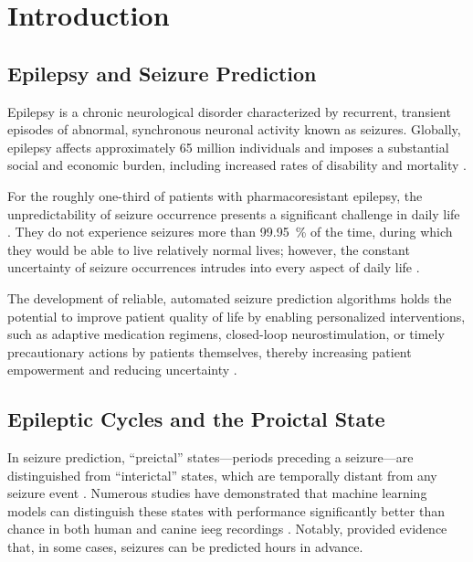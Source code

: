\chapter{Introduction}\label{ch:introduction}
\section{Epilepsy and Seizure Prediction}
Epilepsy is a chronic neurological disorder characterized by recurrent, transient episodes of abnormal, synchronous neuronal activity known as seizures.
Globally, epilepsy affects approximately 65 million individuals and imposes a substantial social and economic burden, including increased rates of disability and mortality \parencite{leonardi_global_2002, feigin_global_2021}.

For the roughly one-third of patients with pharmacoresistant epilepsy, the unpredictability of seizure occurrence presents a significant challenge in daily life \parencite{schulze-bonhage_unpredictability_2008}.
They do not experience seizures more than \SI{99.95}{\percent} of the time, during which they would be able to live relatively normal lives; however, the constant uncertainty of seizure occurrences intrudes into every aspect of daily life \parencite{freestone_forward-looking_2017}.

The development of reliable, automated seizure prediction algorithms holds the potential to improve patient quality of life by enabling personalized interventions, such as adaptive medication regimens, closed-loop neurostimulation, or timely precautionary actions by patients themselves, thereby increasing patient empowerment and reducing uncertainty \parencite{mormann_seizure_2007}.


\section{Epileptic Cycles and the Proictal State}
In seizure prediction, \enquote{preictal} states---periods preceding a seizure---are distinguished from \enquote{interictal} states, which are temporally distant from any seizure event \parencite{yang_seizure_2024}.
Numerous studies have demonstrated that machine learning models can distinguish these states with performance significantly better than chance in both human and canine \gls{ieeg} recordings \parencite{brinkmann_crowdsourcing_2016, kuhlmann_epilepsyecosystemorg_2018}.
Notably, \textcite{cook_prediction_2013} provided evidence that, in some cases, seizures can be predicted hours in advance.


